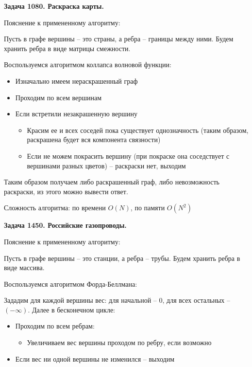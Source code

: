\documentclass[12pt,a4paper]{article}
\begin{document}
    \newcommand{\LabNumber}{4}
    

    \textbf{Задача 1080. Раскраска карты.}

    Пояснение к примененному алгоритму:

    Пусть в графе вершины -- это страны, а ребра -- границы между ними.
    Будем хранить ребра в виде матрицы смежности.

    Воспользуемся алгоритмом коллапса волновой функции:
    \begin{itemize}
        \item Изначально имеем нераскрашенный граф
        \item Проходим по всем вершинам
        \item Если встретили незакрашенную вершину
        \begin{itemize}
            \item Красим ее и всех соседей пока существует однозначность (таким образом, раскрашена будет вся компонента связности)
            \item Если не можем покрасить вершину (при покраске она соседствует с вершинами разных цветов) -- раскраски нет, выходим
        \end{itemize}
    \end{itemize}

    Таким образом получаем либо раскрашенный граф, либо невозможность раскраски, из этого можно вывести ответ.

    Сложность алгоритма: по времени $O(N)$, по памяти $O(N^2)$

    \bigskip

    \textbf{Задача 1450. Российские газопроводы.}

    Пояснение к примененному алгоритму:

    Пусть в графе вершины -- это станции, а ребра -- трубы.
    Будем хранить ребра в виде массива.

    Воспользуемся алгоритмом Форда-Беллмана:

    Зададим для каждой вершины вес: для начальной -- $0$, для всех остальных -- $(-\infty)$.
    Далее в бесконечном цикле:
    \begin{itemize}
        \item Проходим по всем ребрам:
        \begin{itemize}
            \item Увеличиваем вес вершины проходом по ребру, если возможно
        \end{itemize}
        \item Если вес ни одной вершины не изменился -- выходим
    \end{itemize}
\end{document}
